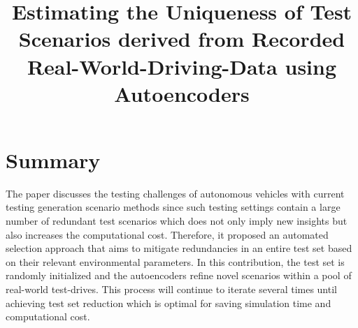 \documentclass[10pt,a4paper]{report}
\title{Estimating the Uniqueness of Test Scenarios derived from Recorded Real-World-Driving-Data using Autoencoders}
\begin{document}
\begin{center}
\textbf{\thetitle}
\end{center}


\section{Summary}
The paper discusses the testing challenges of autonomous vehicles with current testing generation scenario methods since such testing settings contain a large number of redundant test scenarios which does not only imply new insights but also increases the computational cost.
%
Therefore, it proposed an automated selection approach that aims to mitigate redundancies in an entire test set based on their relevant environmental parameters.
%
In this contribution, the test set is randomly initialized and the autoencoders refine novel scenarios within a pool of real-world test-drives.
%
This process will continue to iterate several times until achieving test set reduction which is optimal for saving simulation time and computational cost.
\end{document}
